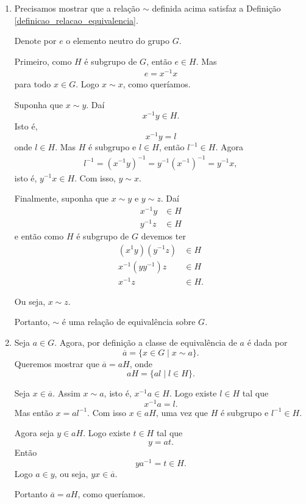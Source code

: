 \begin{prova}
	\begin{enumerate}[label={\roman*})]
		\item Precisamos mostrar que a relação $\sim$ definida acima satisfaz a Definição \eqref{definicao_relacao_equivalencia}.

		Denote por $e$ o elemento neutro do grupo $G$.

		Primeiro, como $H$ é subgrupo de $G$, então $e \in H$. Mas
		\begin{align*}
			e = x^{-1}x
		\end{align*}
		para todo $x \in G$. Logo $x \sim x$, como queríamos.

		Suponha que $x \sim y$. Daí
		\[
			x^{-1}y \in H.
		\]
		Isto é,
		\[
			x^{-1}y = l
		\]
		onde $l \in H$. Mas $H$ é subgrupo e $l \in H$, então $l^{-1} \in H$. Agora
		\begin{align*}
			l^{-1} = (x^{-1}y)^{-1} = y^{-1}(x^{-1})^{-1} = y^{-1}x,
		\end{align*}
		isto é, $y^{-1}x \in H$. Com isso, $y \sim x$.

		Finalmente, suponha que $x \sim y$ e $y \sim z$. Daí
		\begin{align*}
			x^{-1}y &\in H\\
			y^{-1}z &\in H
		\end{align*}
		e então como $H$ é subgrupo de $G$ devemos ter
		\begin{align*}
			(x^{1}y)(y^{-1}z) &\in H\\
			x^{-1}(yy^{-1})z &\in H\\
			x^{-1}z &\in H.
		\end{align*}

		Ou seja, $x \sim z$.

		Portanto, $\sim$ é uma relação de equivalência sobre $G$.

		\item Seja $a \in G$. Agora, por definição a classe de equivalência de $a$ é dada por
		\[
			\overline{a} = \{ x \in G \mid x \sim a\}.
		\]
		Queremos mostrar que $\overline{a} = aH$, onde
		\[
			aH = \{al \mid l \in H\}.
		\]

		Seja $x \in \overline{a}$. Assim $x \sim a$, isto é, $x^{-1}a \in H$. Logo existe $l \in H$ tal que
		\[
			x^{-1}a = l.
		\]
		Mas então $x = al^{-1}$. Com isso $x \in aH$, uma vez que $H$ é subgrupo e $l^{-1} \in H$.

		Agora seja $y \in aH$. Logo existe $t \in H$ tal que
		\[
			y = at.
		\]
		Então
		\[
			ya^{-1} = t \in H.
		\]
		Logo $a \in y$, ou seja, $yx \in \overline{a}$.

		Portanto $\overline{a} = aH$, como queríamos.
	\end{enumerate}
\end{prova}

